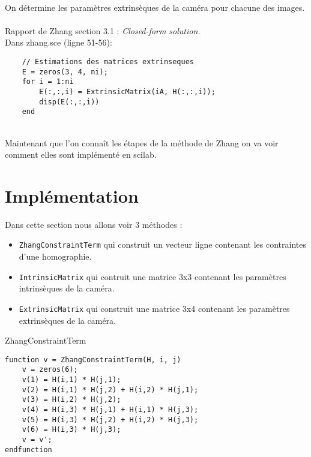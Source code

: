 \documentclass[a4paper,10pt]{article}
\begin{document}
~\\

\begin{paragraph}{On d\'etermine les param\`etres extrins\`eques de la cam\'era pour chacune des images.} ~\\

Rapport de Zhang section 3.1 : \emph{Closed-form solution.} ~\\

Dans zhang.sce (ligne 51-56):

\begin{Verbatim}
	// Estimations des matrices extrinseques
	E = zeros(3, 4, ni);
	for i = 1:ni
		E(:,:,i) = ExtrinsicMatrix(iA, H(:,:,i));
		disp(E(:,:,i))
	end
\end{Verbatim}
\end{paragraph}

~\\

Maintenant que l'on conna\^it les \'etapes de la m\'ethode de Zhang on va voir comment elles sont impl\'ement\'e en scilab.

\section*{Impl\'ementation}

Dans cette section nous allons voir 3 m\'ethodes : 

\begin{itemize}
\item \verb&ZhangConstraintTerm& qui construit un vecteur ligne contenant les contraintes d'une homographie.
\item \verb&IntrinsicMatrix& qui contruit une matrice 3x3 contenant les param\`etres intrins\`eques de la cam\'era.
\item \verb&ExtrinsicMatrix& qui construit une matrice 3x4 contenant les param\`etres extrins\`eques de la cam\'era.
\end{itemize}

\begin{paragraph}{ZhangConstraintTerm}
\begin{Verbatim}
function v = ZhangConstraintTerm(H, i, j)
    v = zeros(6);
    v(1) = H(i,1) * H(j,1);
    v(2) = H(i,1) * H(j,2) + H(i,2) * H(j,1);
    v(3) = H(i,2) * H(j,2);
    v(4) = H(i,3) * H(j,1) + H(i,1) * H(j,3);
    v(5) = H(i,3) * H(j,2) + H(i,2) * H(j,3);
    v(6) = H(i,3) * H(j,3);
    v = v';
endfunction
\end{Verbatim}
\end{paragraph}
\end{document}
